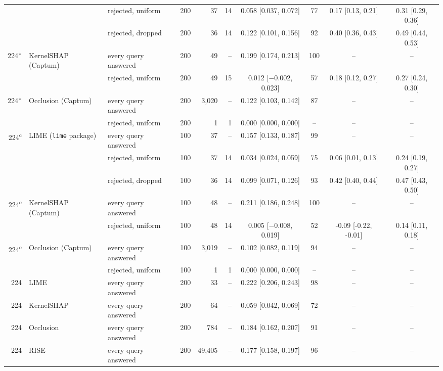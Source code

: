 \begin{table}
\begin{adjustbox}{max width=\textheight}
\begin{tabular}{rllrrrcccc}
 &  & rejected, uniform & 200 & 37 & 14 & 0.058 {[}0.037, 0.072{]} & 77 & 0.17 {[}0.13, 0.21{]} & 0.31 {[}0.29, 0.36{]} \\
 &  & rejected, dropped & 200 & 36 & 14 & 0.122 {[}0.101, 0.156{]} & 92 & 0.40 {[}0.36, 0.43{]} & 0.49 {[}0.44, 0.53{]} \\
224* & KernelSHAP (Captum) & every query answered & 200 & 49 & -- & 0.199 {[}0.174, 0.213{]} & 100 & -- & -- \\
 &  & rejected, uniform & 200 & 49 & 15 & 0.012 {[}$-$0.002, 0.023{]} & 57 & 0.18 {[}0.12, 0.27{]} & 0.27 {[}0.24, 0.30{]} \\
224* & Occlusion (Captum) & every query answered & 200 & 3{,}020 & -- & 0.122 {[}0.103, 0.142{]} & 87 & -- & -- \\
 &  & rejected, uniform & 200 & 1 & 1 & 0.000 {[}0.000, 0.000{]} & -- & -- & -- \\[2pt]
224\textsuperscript{c} & LIME (\texttt{lime} package) & every query answered & 100 & 37 & -- & 0.157 {[}0.133, 0.187{]} & 99 & -- & -- \\
 &  & rejected, uniform & 100 & 37 & 14 & 0.034 {[}0.024, 0.059{]} & 75 & 0.06 {[}0.01, 0.13{]} & 0.24 {[}0.19, 0.27{]} \\
 &  & rejected, dropped & 100 & 36 & 14 & 0.099 {[}0.071, 0.126{]} & 93 & 0.42 {[}0.40, 0.44{]} & 0.47 {[}0.43, 0.50{]} \\
224\textsuperscript{c} & KernelSHAP (Captum) & every query answered & 100 & 48 & -- & 0.211 {[}0.186, 0.248{]} & 100 & -- & -- \\
 &  & rejected, uniform & 100 & 48 & 14 & 0.005 {[}$-$0.008, 0.019{]} & 52 & -0.09 {[}-0.22, -0.01{]} & 0.14 {[}0.11, 0.18{]} \\
224\textsuperscript{c} & Occlusion (Captum) & every query answered & 100 & 3{,}019 & -- & 0.102 {[}0.082, 0.119{]} & 94 & -- & -- \\
 &  & rejected, uniform & 100 & 1 & 1 & 0.000 {[}0.000, 0.000{]} & -- & -- & -- \\[2pt]
224 & LIME & every query answered & 200 & 33 & -- & 0.222 {[}0.206, 0.243{]} & 98 & -- & -- \\
224 & KernelSHAP & every query answered & 200 & 64 & -- & 0.059 {[}0.042, 0.069{]} & 72 & -- & -- \\
224 & Occlusion & every query answered & 200 & 784 & -- & 0.184 {[}0.162, 0.207{]} & 91 & -- & -- \\
224 & RISE & every query answered & 200 & 49{,}405 & -- & 0.177 {[}0.158, 0.197{]} & 96 & -- & -- \\[2pt]

\end{tabular}
\end{adjustbox}
\end{table}
